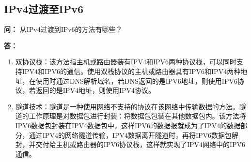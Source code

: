 \documentclass[12pt,hyperref,a4paper,UTF8]{ctexart}
\begin{document}
    \begin{table} [H]       
        \centering
        \caption{231.219.139.111}\label{231.219.139.111}
    \end{table}

    \begin{table}[H]
        \centering
        \caption{249.155.251.15}\label{249.155.251.15}
    \end{table}


\subsection{IPv4过渡至IPv6}
\textbf{问：}
从IPv4过渡到IPv6的方法有哪些？

\textbf{答：}
\begin{enumerate}
    \item 双协议栈：该方法指主机或路由器装有IPV4和IPV6两种协议栈，可以同时支持IPV4和IPV6的通信。使用双栈协议的主机或路由器具有IPV6和IPV4两种地址，在使用时通过DNS解析域名，若DNS返回的是IPV6地址，则使用IPV6协议，若返回的是IPV4地址，则使用IPV4协议。
    \item 隧道技术：隧道是一种使用网络不支持的协议在该网络中传输数据的方法。隧道的工作原理是对数据包进行封装：将数据包包装在其他数据包内。该方法将IPV6数据包封装在IPV4数据包中，这样IPV6的数据报就成为了IPV4的数据部分，通过IPV4的网络隧道传输，IPV4数据离开隧道时，再将IPV6数据包解封，并交付给主机或路由器的IPV6协议栈，这样就实现了IPV4网络中的IPV6通信。
\end{enumerate}
\end{document}
